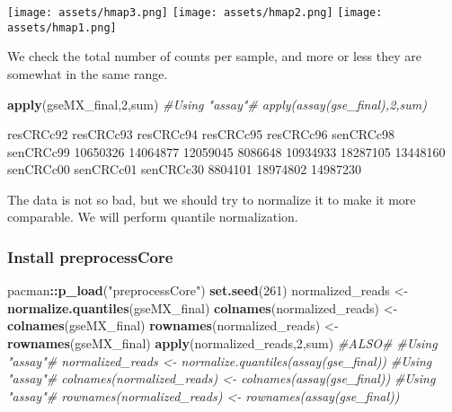 \documentclass[
]{article}
\newenvironment{Shaded}{\begin{snugshade}}{\end{snugshade}}
\newcommand{\CommentTok}[1]{\textcolor[rgb]{0.56,0.35,0.01}{\textit{#1}}}
\newcommand{\DecValTok}[1]{\textcolor[rgb]{0.00,0.00,0.81}{#1}}
\newcommand{\FunctionTok}[1]{\textcolor[rgb]{0.13,0.29,0.53}{\textbf{#1}}}
\newcommand{\NormalTok}[1]{#1}
\newcommand{\OtherTok}[1]{\textcolor[rgb]{0.56,0.35,0.01}{#1}}
\newcommand{\SpecialCharTok}[1]{\textcolor[rgb]{0.81,0.36,0.00}{\textbf{#1}}}
\newcommand{\StringTok}[1]{\textcolor[rgb]{0.31,0.60,0.02}{#1}}
\begin{document}
\texttt{[image: assets/hmap3.png]}
\texttt{[image: assets/hmap2.png]}
\texttt{[image: assets/hmap1.png]}

We check the total number of counts per sample, and more or less they
are somewhat in the same range.

\begin{Shaded}
\begin{Highlighting}[]
\FunctionTok{apply}\NormalTok{(gseMX\_final,}\DecValTok{2}\NormalTok{,sum)}
\CommentTok{\#Using "assay"\# apply(assay(gse\_final),2,sum)}
\end{Highlighting}
\end{Shaded}

\begin{Shaded}
\begin{Highlighting}[]
\NormalTok{resCRCc92 resCRCc93 resCRCc94 resCRCc95 resCRCc96 senCRCc98 senCRCc99 }
\NormalTok{ 10650326  14064877  12059045   8086648  10934933  18287105  13448160 }
\NormalTok{senCRCc00 senCRCc01 senCRCc30 }
\NormalTok{  8804101  18974802  14987230 }
\end{Highlighting}
\end{Shaded}

The data is not so bad, but we should try to normalize it to make it
more comparable. We will perform quantile normalization.

\subsubsection{Install preprocessCore}\label{install-preprocesscore}

\begin{Shaded}
\begin{Highlighting}[]
\NormalTok{pacman}\SpecialCharTok{::}\FunctionTok{p\_load}\NormalTok{(}\StringTok{"preprocessCore"}\NormalTok{)}
\FunctionTok{set.seed}\NormalTok{(}\DecValTok{261}\NormalTok{)}
\NormalTok{normalized\_reads }\OtherTok{\textless{}{-}} \FunctionTok{normalize.quantiles}\NormalTok{(gseMX\_final)}
\FunctionTok{colnames}\NormalTok{(normalized\_reads) }\OtherTok{\textless{}{-}} \FunctionTok{colnames}\NormalTok{(gseMX\_final)}
\FunctionTok{rownames}\NormalTok{(normalized\_reads) }\OtherTok{\textless{}{-}} \FunctionTok{rownames}\NormalTok{(gseMX\_final)}
\FunctionTok{apply}\NormalTok{(normalized\_reads,}\DecValTok{2}\NormalTok{,sum)}
\CommentTok{\#ALSO\#}
\CommentTok{\#Using "assay"\# normalized\_reads \textless{}{-} normalize.quantiles(assay(gse\_final))}
\CommentTok{\#Using "assay"\# colnames(normalized\_reads) \textless{}{-} colnames(assay(gse\_final))}
\CommentTok{\#Using "assay"\# rownames(normalized\_reads) \textless{}{-} rownames(assay(gse\_final))}
\end{Highlighting}
\end{Shaded}
\end{document}
